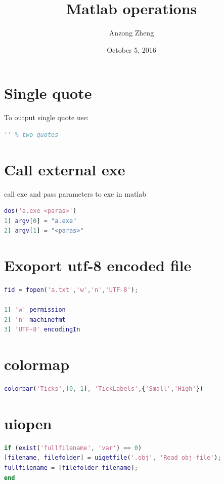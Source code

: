 \documentclass[10pt,a4paper]{article}
\begin{document}
\author{Anzong Zheng}
\title{Matlab operations}
\date{October 5, 2016}
\maketitle
	
\tableofcontents
\newpage\clearpage\setcounter{page}{1}

\section{Single quote}
To output single quote use:

\begin{lstlisting}[language = matlab]
'' % two quotes
\end{lstlisting}

\section{Call external exe}
call exe and pass parameters to exe in matlab
\begin{lstlisting}[language=Matlab]
dos('a.exe <paras>')
1) argv[0] = "a.exe"
2) argv[1] = "<paras>"
\end{lstlisting}

\section{Exoport utf-8 encoded file}
\begin{lstlisting}[language=matlab]
fid = fopen('a.txt','w','n','UTF-8');

1) 'w' permission
2) 'n' machinefmt
3) 'UTF-8' encodingIn
\end{lstlisting}

\section{colormap}
\begin{lstlisting}[language=matlab]
% the range of tick is [0, 1]. I am damn right!
colorbar('Ticks',[0, 1], 'TickLabels',{'Small','High'})
\end{lstlisting}

\section{uiopen}
\begin{lstlisting}[language=matlab]
if (exist('fullfilename', 'var') == 0)
[filename, filefolder] = uigetfile('.obj', 'Read obj-file');
fullfilename = [filefolder filename];
end
\end{lstlisting}
\end{document}
